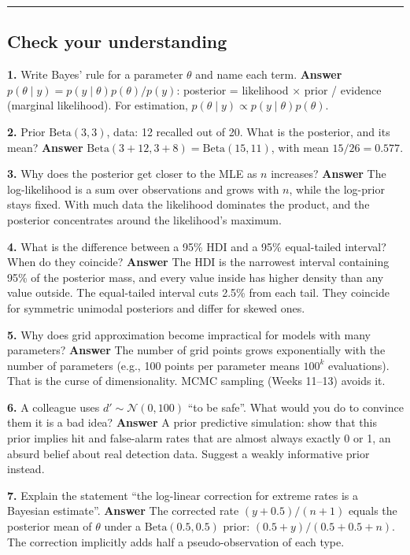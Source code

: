 \begin{center}\rule{0.5\linewidth}{0.5pt}\end{center}

\subsection{Check your understanding}

\textbf{1.} Write Bayes' rule for a parameter \(\theta\) and name each
term. \textbf{Answer}
\(p(\theta\mid y) = p(y\mid\theta)p(\theta)/p(y)\): posterior =
likelihood × prior / evidence (marginal likelihood). For estimation,
\(p(\theta\mid y) \propto p(y\mid\theta)p(\theta)\).

\textbf{2.} Prior \(\mathrm{Beta}(3, 3)\), data: 12 recalled out of 20.
What is the posterior, and its mean? \textbf{Answer}
\(\mathrm{Beta}(3 + 12, 3 + 8) = \mathrm{Beta}(15, 11)\), with mean
\(15/26 = 0.577\).

\textbf{3.} Why does the posterior get closer to the MLE as \(n\)
increases? \textbf{Answer} The log-likelihood is a sum over observations
and grows with \(n\), while the log-prior stays fixed. With much data
the likelihood dominates the product, and the posterior concentrates
around the likelihood's maximum.

\textbf{4.} What is the difference between a 95\% HDI and a 95\%
equal-tailed interval? When do they coincide? \textbf{Answer} The HDI is
the narrowest interval containing 95\% of the posterior mass, and every
value inside has higher density than any value outside. The equal-tailed
interval cuts 2.5\% from each tail. They coincide for symmetric unimodal
posteriors and differ for skewed ones.

\textbf{5.} Why does grid approximation become impractical for models
with many parameters? \textbf{Answer} The number of grid points grows
exponentially with the number of parameters (e.g., 100 points per
parameter means \(100^k\) evaluations). That is the curse of
dimensionality. MCMC sampling (Weeks 11--13) avoids it.

\textbf{6.} A colleague uses \(d' \sim \mathcal{N}(0, 100)\) ``to be
safe''. What would you do to convince them it is a bad idea?
\textbf{Answer} A prior predictive simulation: show that this prior
implies hit and false-alarm rates that are almost always exactly 0 or 1,
an absurd belief about real detection data. Suggest a weakly informative
prior instead.

\textbf{7.} Explain the statement ``the log-linear correction for
extreme rates is a Bayesian estimate''. \textbf{Answer} The corrected
rate \((y + 0.5)/(n + 1)\) equals the posterior mean of \(\theta\) under
a \(\mathrm{Beta}(0.5, 0.5)\) prior: \((0.5 + y)/(0.5 + 0.5 + n)\). The
correction implicitly adds half a pseudo-observation of each type.

